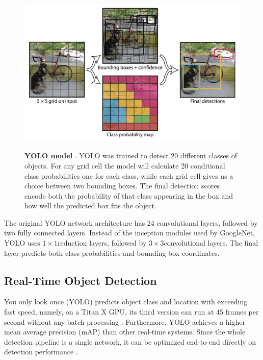 \begin{figure}[t]
\begin{center}
\centering
\includegraphics[width=\textwidth]{thesis-template-master/images/yolomodel.png}
\label{fig:cellnet}
\end{center}
\caption{\textbf{YOLO model\cite{yolov1} }. YOLO was trained to detect 20 different classes of objects.  For any grid cell the model will calculate 20 conditional class probabilities one for each class, while each grid cell gives us a choice between two bounding boxes. The final detection scores encode both the probability of that class appearing in the box and how well the predicted box fits the object.}
\end{figure}


 The original  YOLO network architecture has 24 convolutional layers, followed by two fully connected layers\cite{yolov1}. Instead of the inception modules used by GoogleNet, YOLO uses $1 \times 1 $reduction layers, followed by $3 \times3 $convolutional layers. The final layer predicts both class probabilities and bounding box coordinates.


\subsection{ Real-Time Object Detection }

You only look once (YOLO) predicts object class and location with exceeding fast speed, namely, on a Titan X GPU, its third version can run at 45 frames per second without any batch processing \cite{18}. Furthermore, YOLO achieves a higher mean average precision (mAP) than other real‐time systems. Since the whole detection pipeline is a single network, it can be optimized end-to-end directly on detection performance \cite{18}.

